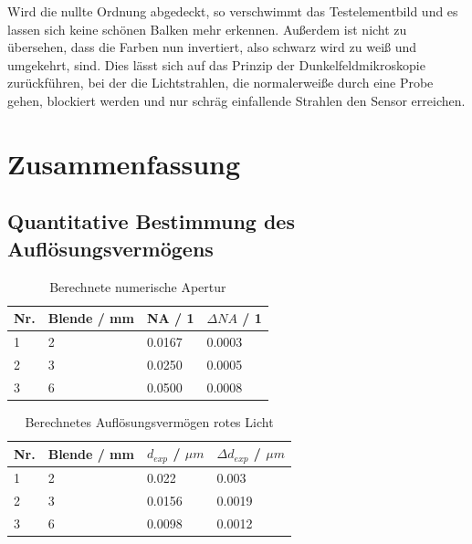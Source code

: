 \documentclass[12pt,a4paper,twoside]{article}
\begin{document}
\noindent
Wird die nullte Ordnung abgedeckt, so verschwimmt das Testelementbild und es lassen sich keine schönen Balken mehr erkennen.
Außerdem ist nicht zu übersehen, dass die Farben nun invertiert, also schwarz wird zu weiß und umgekehrt, sind.
Dies lässt sich auf das Prinzip der Dunkelfeldmikroskopie zurückführen, bei der die Lichtstrahlen, die normalerweiße durch eine Probe gehen, blockiert werden und nur schräg einfallende Strahlen den Sensor erreichen. \cite{dunkelfeldmikroskopie}



\section{Zusammenfassung} %

\subsection{Quantitative Bestimmung des Auflösungsvermögens}

\begin{table}[H]
    \centering
    \caption{Berechnete numerische Apertur}
    \label{tab:BerechneteNA}
    \begin{tabular}{| l | l | l | l |}
        \hline
        Nr. & Blende / mm & NA / 1 & $\Delta NA$ / 1 \\
        \hline
        1 & 2 & 0.0167 & 0.0003 \\
        2 & 3 & 0.0250 & 0.0005 \\
        3 & 6 & 0.0500 & 0.0008 \\
        \hline
    \end{tabular}
\end{table}

\begin{table}[H]
    \centering
    \caption{Berechnetes Auflösungsvermögen rotes Licht}
    \label{tab:BerechneteAVrot}
    \begin{tabular}{| l | l | l | l |}
        \hline
        Nr. & Blende / mm & $d_{exp}$ / $\mu m$ & $\Delta d_{exp}$ / $\mu m$ \\
        \hline
        1 & 2 & 0.022  & 0.003  \\
        2 & 3 & 0.0156 & 0.0019 \\
        3 & 6 & 0.0098 & 0.0012 \\
        \hline
    \end{tabular}
\end{table}
\end{document}
